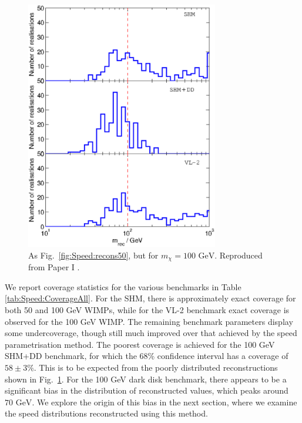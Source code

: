  \begin{figure}[t]
\centering
\includegraphics[width=0.75\textwidth]{Speed/100GeV-1.eps}
\caption[As Fig.~\ref{fig:Speed:recons50}, but for \(m_\chi = 100 \textrm{ GeV}\)]{As Fig.\ \ref{fig:Speed:recons50}, but for \(m_\chi = 100 \textrm{ GeV}\). Reproduced from Paper I \cite{Kavanagh:2012}.}
  \label{fig:Speed:recons100}
\end{figure}


We report coverage statistics for the various benchmarks in Table \ref{tab:Speed:CoverageAll}. For the SHM, there is approximately exact coverage for both 50 and 100 GeV WIMPs, while for the VL-2 benchmark exact coverage is observed for the 100 GeV WIMP. The remaining benchmark parameters display some undercoverage, though still much improved over that achieved by the speed parametrisation method. The poorest coverage is achieved for the 100 GeV SHM+DD benchmark, for which the 68\% confidence interval has a coverage of \(58 \pm 3 \%\). This is to be expected from the poorly distributed reconstructions shown in Fig.\ \ref{fig:Speed:recons100}. For the 100 GeV dark disk benchmark, there appears to be a significant bias in the distribution of reconstructed values, which peaks around \(70 \textrm{ GeV}\). We explore the origin of this bias in the next section, where we examine the speed distributions reconstructed using this method.

